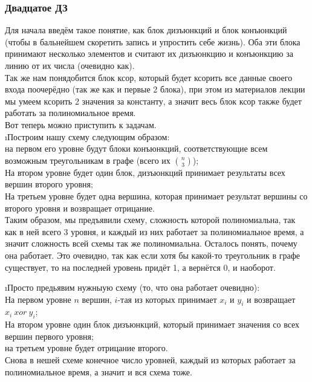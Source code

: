 \subsubsection{Двадцатое ДЗ}

Для начала введём такое понятие, как блок дизъюнкций и блок конъюнкций (чтобы в бальнейшем скоретить запись и упростить себе жизнь). Оба эти блока принимают несколько элементов и считают их дизъюнкцию и конъюнкцию за линию от их числа (очевидно как).\\
Так же нам понядобится блок ксор, который будет ксорить все данные своего входа поочерёдно (так же как и первые 2 блока), при этом из материалов лекции мы умеем ксорить 2 значения за константу, а значит весь блок ксор также будет работать за полиномиальное время.\\ 
Вот теперь можно приступить к задачам.\\


\i Построим нашу схему следующим образом:\\
на первом его уровне будут блоки конъюнкций, соответствующие всем возможным треугольникам в графе (всего их $\binom{n}{3}$);\\
На втором уровне будет один блок, дизъюнкций принимает результаты всех вершин второго уровня;\\
На третьем уровне будет одна вершина, которая принимает результат вершины со второго уровня и возвращает отрицание.\\
Таким образом, мы предъявили схему, сложность которой полиномиальна, так как в ней всего 3 уровня, и каждый из них работает за полиномиальное время, а значит сложность всей схемы так же полиномиальна. Осталось понять, почему она работает. Это очевидно, так как если хотя бы какой-то треугольник в графе существует, то на последней уровень придёт 1, а вернётся 0, и наоборот.

\i Просто предьявим нужныую схему (то, что она работает очевидно):\\
На первом уровне $n$ вершин, $i$-тая из которых принимает $x_i$ и $y_i$ и возвращает $x_i\ xor\ y_i$;\\
На втором уровне один блок дизъюнкций, который принимает значения со всех вершин первого уровня;\\
на третьем уровне будет отрицание второго.\\
Снова в нешей схеме конечное число уровней, каждый из которых работает за полиномиальное время, а значит и вся схема тоже.

